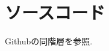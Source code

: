 \documentclass[twocolumn]{jarticle}     %
\begin{document}

\section{ソースコード}
Githubの同階層を参照.



\end{document}
